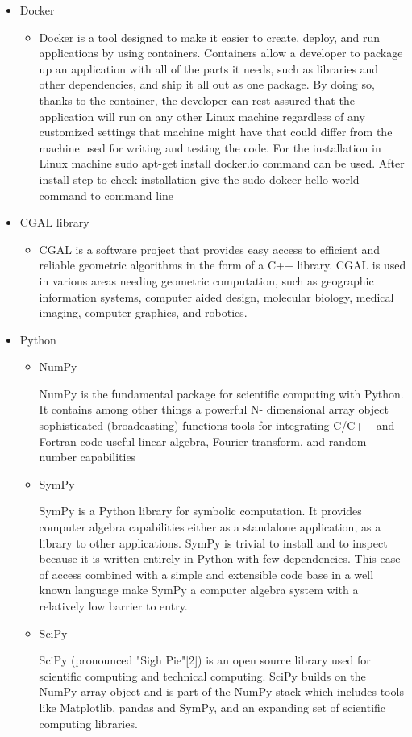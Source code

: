 \documentclass[12pt,twoside]{article}
\begin{document}
\begin{itemize}
	\item Docker
	\begin{itemize}
		\item Docker is a tool designed to make it easier to create, deploy, and run
applications by using containers. Containers allow a developer to
package up an application with all of the parts it needs, such as
libraries and other dependencies, and ship it all out as one package.
By doing so, thanks to the container, the developer can rest assured
that the application will run on any other Linux machine regardless
of any customized settings that machine might have that could differ
from the machine used for writing and testing the code. For the
installation in Linux machine sudo apt-get install docker.io command
can be used. After install step to check installation give the sudo
dokcer hello world command to command line
	\end{itemize}
	\item CGAL library
	\begin{itemize}
		\item CGAL is a software project that provides easy access to efficient and
reliable geometric algorithms in the form of a C++ library. CGAL is
used in various areas needing geometric computation, such as
geographic information systems, computer aided design, molecular
biology, medical imaging, computer graphics, and robotics.
	\end{itemize}
	\item Python
	\begin{itemize}
		\item NumPy \newline 
		\par 
		NumPy is the fundamental package for scientific computing
with Python. It contains among other things a powerful N-
dimensional array object sophisticated (broadcasting) functions tools
for integrating C/C++ and Fortran code useful linear algebra, Fourier
transform, and random number capabilities
		\item SymPy \newline
		\par
		SymPy is a Python library for symbolic computation. It
provides computer algebra capabilities either as a standalone
application, as a library to other applications. SymPy is trivial to
install and to inspect because it is written entirely in Python
with few dependencies. This ease of access combined with a
simple and extensible code base in a well known language
make SymPy a computer algebra system with a relatively low
barrier to entry.
		\item SciPy \newline 
		\par
		SciPy (pronounced "Sigh Pie"[2]) is an open source library
used for scientific computing and technical computing. SciPy builds
on the NumPy array object and is part of the NumPy stack which
includes tools like Matplotlib, pandas and SymPy, and an expanding
set of scientific computing libraries.
		

\end{itemize}
\end{itemize}
\end{document}

